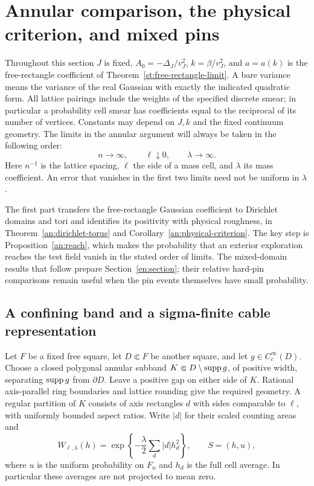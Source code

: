 \section{Annular comparison, the physical criterion, and mixed pins}
\label{an:section}

Throughout this section $J$ is fixed, $A_0=-\Delta_J/v_J^2$,
$k=\beta/v_J^2$, and $a=a(k)$ is the free-rectangle coefficient of
Theorem~\ref{st:free-rectangle-limit}.  A bare variance means the
variance of the real Gaussian with exactly the indicated quadratic
form.  All lattice pairings include the weights of the specified
discrete smear; in particular a probability cell smear has coefficients
equal to the reciprocal of its number of vertices.  Constants may
depend on $J,k$ and the fixed continuum geometry.  The limits in the
annular argument will always be taken in the following order:
\begin{equation}
 n\longrightarrow\infty,\qquad \ell\downarrow0,\qquad
 \lambda\longrightarrow\infty.
 \label{an:limit-order}
\end{equation}
Here $n^{-1}$ is the lattice spacing, $\ell$ the side of a mass cell,
and $\lambda$ its mass coefficient.  An error that vanishes in the
first two limits need not be uniform in $\lambda$.

The first part transfers the free-rectangle Gaussian coefficient to
Dirichlet domains and tori and identifies its positivity with physical
roughness, in Theorem~\ref{an:dirichlet-torus} and
Corollary~\ref{an:physical-criterion}.
The key step is Proposition~\ref{an:reach}, which makes the probability
that an exterior exploration reaches the test field vanish in the
stated order of limits.
The mixed-domain results that follow prepare Section~\ref{en:section};
their relative hard-pin comparisons remain useful when the pin
events themselves have small probability.

\subsection{A confining band and a sigma-finite cable representation}

Let $F$ be a fixed free square, let $D\Subset F$ be another square,
and let $g\in C_c^\infty(D)$.  Choose a closed polygonal annular
subband $K\Subset D\setminus\operatorname{supp} g$, of positive width, separating
$\operatorname{supp} g$ from $\partial D$.  Leave a positive gap on either side of
$K$.  Rational axis-parallel ring boundaries and lattice rounding
give the required geometry.  A regular partition of $K$ consists of
axis rectangles $d$ with sides comparable to $\ell$, with uniformly
bounded aspect ratios.  Write $|d|$ for their scaled counting areas and
\begin{equation}
 W_{\ell,\lambda}(h)=
 \exp\left\{-\frac\lambda2\sum_d |d|h_d^2\right\},
 \qquad S=(h,u),
 \label{an:band-weight}
\end{equation}
where $u$ is the uniform probability on $F_n$ and $h_d$ is the full
cell average.  In particular these averages are not projected to
mean zero.

